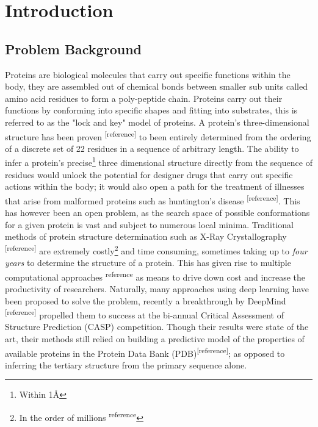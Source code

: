 
\chapter{Introduction}

\section{Problem Background}
   Proteins are biological molecules that carry out specific functions within the body,
   they are assembled out of chemical bonds between smaller sub units called amino acid residues
   to form a poly-peptide chain. Proteins carry out their functions 
   by conforming into specific shapes and fitting into substrates,
   this is referred to as the "lock and key" model of proteins. A
   protein's three-dimensional structure has been proven \textsuperscript{[reference]} to been
   entirely determined from the ordering of a discrete set of 22 residues
   in a sequence of arbitrary length. The ability to infer a protein's precise\footnote{Within 1\AA}
   three dimensional structure directly from the sequence of residues would
   unlock the potential for designer drugs that carry out specific actions within the body;
   it would also open a path for the treatment of illnesses that arise from malformed
   proteins such as huntington's disease \textsuperscript{[reference]}.
   This has however been an open problem, as the search space of possible conformations
   for a given protein is vast and subject to numerous local minima. Traditional
   methods of protein structure determination such as X-Ray Crystallography \textsuperscript{[reference]}
   are extremely costly\footnote{In the order of millions \textsuperscript{reference}} and time
   consuming, sometimes taking up to \emph{four years} to determine the structure of a protein.
   This has given rise to multiple computational approaches \textsuperscript{reference} as means
   to drive down cost and increase the productivity of researchers. 
   \linebreak
   Naturally, many approaches using deep learning have been proposed to solve the problem,
   recently a breakthrough by DeepMind \textsuperscript{[reference]} propelled them to success
   at the bi-annual Critical Assessment of Structure Prediction (CASP) competition. Though their
   results were state of the art, their methods still relied on building a predictive model of the
   properties of available proteins in the Protein Data Bank (PDB)\textsuperscript{[reference]}; as 
   opposed to inferring the tertiary structure from the primary sequence alone.

